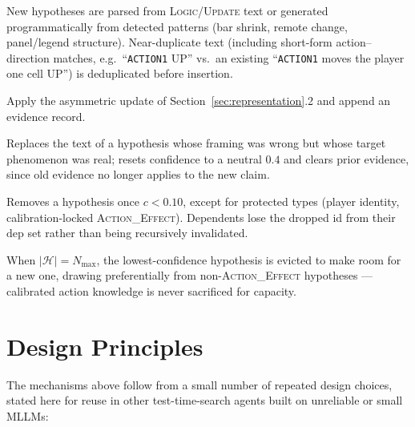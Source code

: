 \documentclass{article}
\newcommand{\Hyp}{\mathcal{H}}
\newcommand{\Dep}{\mathrm{dep}}
\begin{document}
\begin{description}[nosep]
\item[Add] New hypotheses are parsed from \textsc{Logic}/\textsc{Update}
text or generated programmatically from detected patterns (bar shrink,
remote change, panel/legend structure). Near-duplicate text (including
short-form action–direction matches, e.g.\ ``\texttt{ACTION1} UP'' vs.\
an existing ``\texttt{ACTION1} moves the player one cell UP'') is
deduplicated before insertion.
\item[Confirm / Contradict] Apply the asymmetric update of
Section~\ref{sec:representation}.2 and append an evidence record.
\item[Rewrite] Replaces the text of a hypothesis whose framing was
wrong but whose target phenomenon was real; resets confidence to a
neutral $0.4$ and clears prior evidence, since old evidence no longer
applies to the new claim.
\item[Drop] Removes a hypothesis once $c < 0.10$, except for
protected types (player identity, calibration-locked
\textsc{Action\_Effect}). Dependents lose the dropped id from their
$\Dep$ set rather than being recursively invalidated.
\item[Evict] When $|\Hyp| = N_{\max}$, the lowest-confidence hypothesis
is evicted to make room for a new one, drawing preferentially from
non-\textsc{Action\_Effect} hypotheses — calibrated action knowledge is
never sacrificed for capacity.
\end{description}

\section{Design Principles}
\label{sec:principles}

The mechanisms above follow from a small number of repeated design
choices, stated here for reuse in other test-time-search agents built
on unreliable or small MLLMs:
\end{document}
